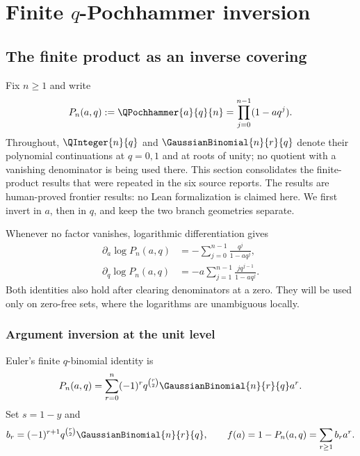 \chapter{Finite \texorpdfstring{\(q\)}{q}-Pochhammer inversion}
\label{chap:finite-q-pochhammer-inversion}

\section{The finite product as an inverse covering}
\label{fp-finite-covering}

Fix \(n\geq1\) and write
\[
 P_n(a,q):=\QPochhammer{a}{q}{n}=\prod_{j=0}^{n-1}(1-aq^j).
\]
Throughout, \(\QInteger{n}{q}\) and \(\GaussianBinomial{n}{r}{q}\) denote their polynomial
continuations at \(q=0,1\) and at roots of unity; no quotient with a vanishing
denominator is being used there.
This section consolidates the finite-product results that were repeated in the
six source reports.  The results are human-proved frontier results: no Lean
formalization is claimed here.  We first invert in \(a\), then in \(q\), and
keep the two branch geometries separate.

Whenever no factor vanishes, logarithmic differentiation gives
\begin{align}
 \partial_a\log P_n(a,q)
  &=-\sum_{j=0}^{n-1}\frac{q^j}{1-aq^j},
  \label{fp-a-logder}\\
 \partial_q\log P_n(a,q)
  &=-a\sum_{j=1}^{n-1}\frac{j q^{j-1}}{1-aq^j}.
  \label{fp-q-logder}
\end{align}
Both identities also hold after clearing denominators at a zero.  They will be
used only on zero-free sets, where the logarithms are unambiguous locally.

\subsection{Argument inversion at the unit level}

Euler's finite \(q\)-binomial identity is
\begin{equation}
 P_n(a,q)=\sum_{r=0}^{n}(-1)^r q^{\binom r2}
 \GaussianBinomial{n}{r}{q}a^r.
 \label{fp-finite-q-binomial}
\end{equation}
Set \(s=1-y\) and
\[
 b_r=(-1)^{r+1}q^{\binom r2}\GaussianBinomial{n}{r}{q},
 \qquad f(a)=1-P_n(a,q)=\sum_{r\geq1}b_ra^r.
\]

